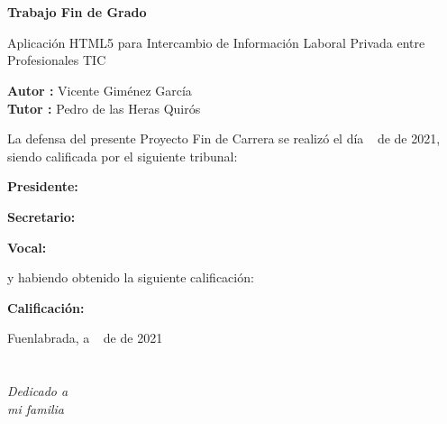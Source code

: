 \documentclass[a4paper, 12pt]{book}
\begin{document}
    \chapter*{}

    \vspace{-4cm}
    \begin{center}
        \LARGE
        \textbf{Trabajo Fin de Grado}

        \vspace{1cm}
        \large
        Aplicación HTML5 para Intercambio de Información Laboral Privada entre Profesionales TIC

        \vspace{1cm}
        \large
        \textbf{Autor :} Vicente Giménez García \\
        \textbf{Tutor :} Pedro de las Heras Quirós

    \end{center}

    \vspace{1cm}
    La defensa del presente Proyecto Fin de Carrera se realizó el día \qquad$\;\,$ de \qquad\qquad\qquad\qquad \newline de 2021, siendo calificada por el siguiente tribunal:


    \vspace{0.5cm}
    \textbf{Presidente:}

    \vspace{1.2cm}
    \textbf{Secretario:}

    \vspace{1.2cm}
    \textbf{Vocal:}


    \vspace{1.2cm}
    y habiendo obtenido la siguiente calificación:

    \vspace{1cm}
    \textbf{Calificación:}


    \vspace{1cm}
    \begin{flushright}
        Fuenlabrada, a \qquad$\;\,$ de \qquad\qquad\qquad\qquad de 2021
    \end{flushright}


    \chapter*{}
    \begin{flushright}
        \textit{Dedicado a \\
        mi familia}
    \end{flushright}
\end{document}
